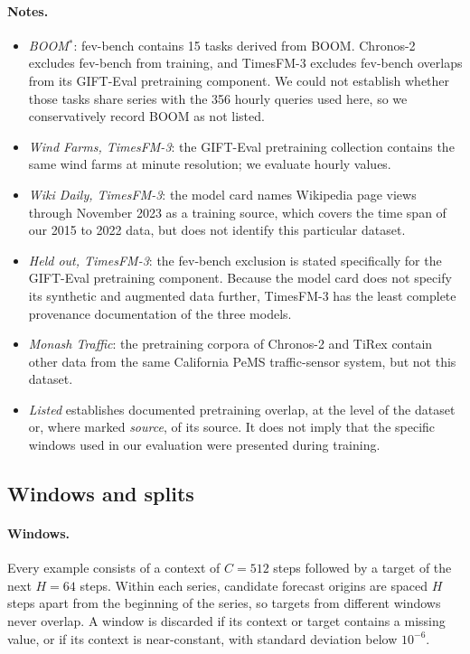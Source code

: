 \documentclass{article} %
\begin{document}
\paragraph{Notes.}
\begin{itemize}[leftmargin=*]
  \item \emph{BOOM}$^{\ast}$: fev-bench contains 15 tasks derived from BOOM. Chronos-2
  excludes fev-bench from training, and TimesFM-3 excludes fev-bench overlaps from its
  GIFT-Eval pretraining component. We could not establish whether those tasks share series
  with the 356 hourly queries used here, so we conservatively record BOOM as not listed.
  \item \emph{Wind Farms, TimesFM-3}: the GIFT-Eval pretraining collection contains the same
  wind farms at minute resolution; we evaluate hourly values.
  \item \emph{Wiki Daily, TimesFM-3}: the model card names Wikipedia page views through
  November 2023 as a training source, which covers the time span of our 2015 to 2022 data,
  but does not identify this particular dataset.
  \item \emph{Held out, TimesFM-3}: the fev-bench exclusion is stated specifically for the
  GIFT-Eval pretraining component. Because the model card does not specify its synthetic and
  augmented data further, TimesFM-3 has the least complete provenance documentation of the
  three models.
  \item \emph{Monash Traffic}: the pretraining corpora of Chronos-2 and TiRex contain other
  data from the same California PeMS traffic-sensor system, but not this dataset.
  \item \emph{Listed} establishes documented pretraining overlap, at the level of the dataset
  or, where marked \emph{source}, of its source. It does not imply that the specific windows
  used in our evaluation were presented during training.
\end{itemize}

\subsection{Windows and splits}
\label{app:splits}

\paragraph{Windows.}
Every example consists of a context of $C=512$ steps followed by a target of the next $H=64$ steps. Within each series, candidate forecast origins are spaced $H$ steps apart from the beginning of the series, so targets from different windows never overlap. A window is discarded if its context or target contains a missing value, or if its context is near-constant, with standard deviation below $10^{-6}$.
\end{document}
